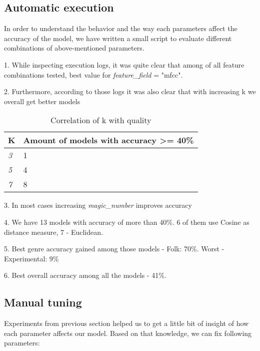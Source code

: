 \documentclass[11pt]{article}
\begin{document}
\subsection*{Automatic execution}

In order to understand the behavior and the way each parameters affect the accuracy of the model, we have written a small script to evaluate different combinations of above-mentioned parameters.

1. While inspecting execution logs, it was quite clear that among of all feature combinations tested, best value for \textit{feature\_field} = "mfcc".

2. Furthermore, according to those logs it was also clear that with increasing k we overall get better models

\begin{table*}[htb]
\begin{center}
\begin{tabular}{|l|l|}
\hline
\textbf{K}          & \textbf{Amount of models with accuracy >= 40\%}                             
\\ \hline
\textit{3}          & 1                         
\\ \hline
\textit{5}          & 4                                                              
\\ \hline
\textit{7}          & 8            
\\ \hline
\end{tabular}%
\caption{Correlation of k with quality}
\end{center}
\end{table*}

3. In most cases increasing \textit{magic\_number} improves accuracy

4. We have 13 models with accuracy of more than 40\%. 6 of them use Cosine as distance measure, 7 - Euclidean.

5. Best genre accuracy gained among those models - Folk: 70\%. Worst - Experimental: 9\%

6. Best overall accuracy among all the models - 41\%. 

\subsection*{Manual tuning}

Experiments from previous section helped us to get a little bit of insight of how each parameter affects our model.
Based on that knowledge, we can fix following parameters:
\end{document}
